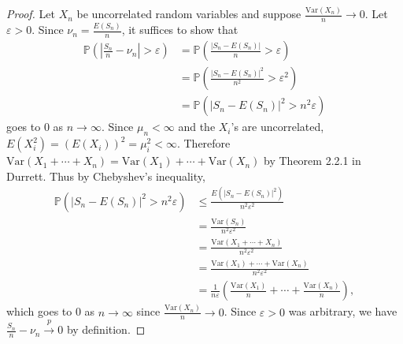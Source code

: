 \documentclass[11pt,oneside,english]{amsart}
\theoremstyle{definition}
\newcommand{\ve}{\varepsilon}
\newcommand{\Var}{\text{Var}}
\newcommand{\1}{\mathbbm{1}}
\newcommand{\p}{\mathbb{P}}
\begin{document}
\begin{enumerate}[leftmargin=*]
\begin{proof}
Let $X_n$ be uncorrelated random variables and suppose $\frac{\Var(X_n)}{n}\to0$. Let $\ve>0$. Since $\nu_n=\frac{E(S_n)}{n}$, it suffices  to show that
\begin{align*}
\p\left(\left|\frac{S_n}{n}-\nu_n\right|>\ve\right)&=\p\left(\frac{|S_n-E(S_n)|}{n}>\ve\right)\\[2mm]
&=\p\left(\frac{|S_n-E(S_n)|^2}{n^2}>\ve^2\right)\\[2mm]
&=\p\left(|S_n-E(S_n)|^2>n^2\ve\right)
\end{align*}
goes to 0 as $n\to\infty$. Since $\mu_n<\infty$ and the $X_i$'s are uncorrelated, $E(X_i^2)=(E(X_i))^2=\mu_i^2<\infty$. Therefore $\Var(X_1+\cdots+X_n)=\Var(X_1)+\cdots+\Var(X_n)$ by Theorem 2.2.1 in Durrett. Thus by Chebyshev's inequality,
\begin{align*}
\p\left(|S_n-E(S_n)|^2>n^2\ve\right)&\leq \frac{E(|S_n-E(S_n)|^2)}{n^2\ve^2}\\[2mm]
&=\frac{\Var(S_n)}{n^2\ve^2}\\[2mm]
&=\frac{\Var(X_1+\cdots +X_n)}{n^2\ve^2}\\[2mm]
&=\frac{\Var(X_1)+\cdots+\Var(X_n)}{n^2\ve^2}\\[2mm]
&=\frac{1}{n\ve}\left(\frac{\Var(X_1)}{n}+\cdots+\frac{\Var(X_n)}{n}\right),
\end{align*}
which goes to 0 as $n\to\infty$ since $\frac{\Var(X_n)}{n}\to0$. Since $\ve>0$ was arbitrary, we have $\frac{S_n}{n}-\nu_n \xrightarrow{p}0$ by definition.
\end{proof}

\end{enumerate}
\end{document}
